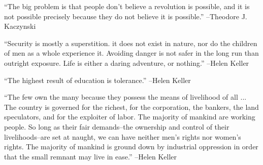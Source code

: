 \documentclass{article}%
\begin{document}
\begin{minipage}{\textwidth}%
\flushleft%
“The big problem is that people don't believe a revolution is possible, and it is not possible precisely because they do not believe it is possible.”%
\linebreak%
\vspace{1mm}%
–Theodore J. Kaczynski%
\linebreak%
\vspace{1mm}%
\end{minipage}%
\linebreak%
\vspace{1mm}%
\begin{minipage}{\textwidth}%
\flushleft%
“Security is mostly a superstition. it does not exist in nature, nor do the children of men as a whole experience it. Avoiding danger is not safer in the long run than outright exposure. Life is either a daring adventure, or nothing.”%
\linebreak%
\vspace{1mm}%
–Helen Keller%
\linebreak%
\vspace{1mm}%
\end{minipage}%
\linebreak%
\vspace{1mm}%
\begin{minipage}{\textwidth}%
\flushleft%
“The highest result of education is tolerance.”%
\linebreak%
\vspace{1mm}%
–Helen Keller%
\linebreak%
\vspace{1mm}%
\end{minipage}%
\linebreak%
\vspace{1mm}%
\begin{minipage}{\textwidth}%
\flushleft%
“The few own the many because they possess the means of livelihood of all ... The country is governed for the richest, for the corporation, the bankers, the land speculators, and for the exploiter of labor. The majority of mankind are working people. So long as their fair demands–the ownership and control of their livelihoods–are set at naught, we can have neither men's rights nor women's rights. The majority of mankind is ground down by industrial oppression in order that the small remnant may live in ease.”%
\linebreak%
\vspace{1mm}%
–Helen Keller%
\linebreak%
\vspace{1mm}%
\end{minipage}%
\end{document}
